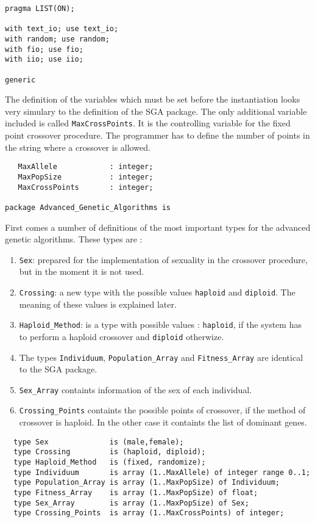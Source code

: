 \begin{verbatim}
pragma LIST(ON);

with text_io; use text_io;
with random; use random;
with fio; use fio;
with iio; use iio;

generic
\end{verbatim}
The definition of the variables which must be set before the instantiation looks
very simulary to the definition of the SGA package. The only additional variable
included is called {\tt MaxCrossPoints}. It is the controlling variable for the
fixed point crossover procedure. The programmer has to define the number of points
in the string where a crossover is allowed.
\begin{verbatim}
   MaxAllele            : integer;
   MaxPopSize           : integer;
   MaxCrossPoints       : integer;

package Advanced_Genetic_Algorithms is
\end{verbatim}
First comes a number of definitions of the most important types for the advanced
genetic algorithms. These types are :
  \begin{enumerate}
  \item {\tt Sex}: prepared for the implementation of sexuality in the crossover
  procedure, but in the moment it is not used.
  \item {\tt Crossing}: a new type with the possible values {\tt haploid} and
  {\tt diploid}. The meaning of these values is explained later.
  \item {\tt Haploid\_Method}: is a type with possible values : {\tt haploid},
  if the system has to perform a haploid crossover and {\tt diploid} otherwize.
  \item The types {\tt Individuum}, {\tt Population\_Array} and {\tt Fitness\_Array}
  are identical to the SGA package.
  \item {\tt Sex\_Array} containts information of the sex of each individual.
  \item {\tt Crossing\_Points} containts the possible points of crossover, if
  the method of crossover is haploid. In the other case it containts the list
  of dominant genes.
  \end{enumerate}
\begin{verbatim}
  type Sex              is (male,female);
  type Crossing         is (haploid, diploid);
  type Haploid_Method   is (fixed, randomize);
  type Individuum       is array (1..MaxAllele) of integer range 0..1;
  type Population_Array is array (1..MaxPopSize) of Individuum;
  type Fitness_Array    is array (1..MaxPopSize) of float;
  type Sex_Array        is array (1..MaxPopSize) of Sex;
  type Crossing_Points  is array (1..MaxCrossPoints) of integer;
\end{verbatim}
